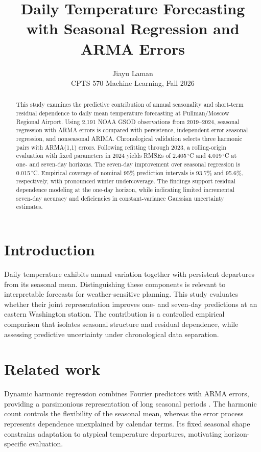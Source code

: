 \documentclass{article}
\title{Daily Temperature Forecasting\\with Seasonal Regression and ARMA Errors}
\author{Jiayu \qquad Laman\\CPTS 570 Machine Learning, Fall 2026}
\begin{document}
\maketitle
\begin{abstract}
This study examines the predictive contribution of annual seasonality and
short-term residual dependence to daily mean temperature forecasting at
Pullman/Moscow Regional Airport. Using 2,191 NOAA GSOD observations from
2019--2024, seasonal regression with ARMA errors is compared with persistence,
independent-error seasonal regression, and nonseasonal ARIMA. Chronological
validation selects three harmonic pairs with ARMA(1,1) errors. Following
refitting through 2023, a rolling-origin evaluation with fixed parameters in
2024 yields RMSEs of 2.405\,$^\circ$C and 4.019\,$^\circ$C at one- and
seven-day horizons. The seven-day improvement over seasonal regression is
0.015\,$^\circ$C. Empirical coverage of nominal 95\% prediction intervals is
93.7\% and 95.6\%, respectively, with pronounced winter undercoverage.
The findings support residual dependence modeling at the one-day horizon,
while indicating limited incremental seven-day accuracy and deficiencies in
constant-variance Gaussian uncertainty estimates.
\end{abstract}

\section{Introduction}
Daily temperature exhibits annual variation together with persistent departures
from its seasonal mean. Distinguishing these components is relevant to
interpretable forecasts for weather-sensitive planning. This study evaluates
whether their joint representation improves one- and seven-day predictions
at an eastern Washington station. The contribution is a controlled empirical
comparison that isolates seasonal structure and residual dependence, while
assessing predictive uncertainty under chronological data separation.

\section*{Related work}
Dynamic harmonic regression combines Fourier predictors with ARMA errors,
providing a parsimonious representation of long seasonal periods
\cite{hyndman2021}. The harmonic count controls the flexibility of the seasonal
mean, whereas the error process represents dependence unexplained by calendar
terms. Its fixed seasonal shape constrains adaptation to atypical temperature
departures, motivating horizon-specific evaluation.
\end{document}
